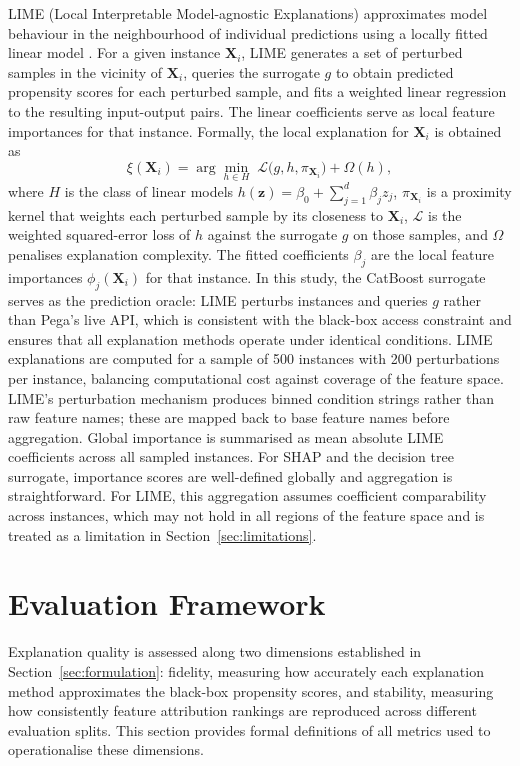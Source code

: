 \documentclass[oneside]{memoir} %
\begin{document}
LIME (Local Interpretable Model-agnostic Explanations) approximates model behaviour in the neighbourhood of individual predictions using a locally fitted linear model \parencite{ribeiro_why_2016}. For a given instance $\mathbf{X}_i$, LIME generates a set of perturbed samples in the vicinity of $\mathbf{X}_i$, queries the surrogate $g$ to obtain predicted propensity scores for each perturbed sample, and fits a weighted linear regression to the resulting input-output pairs. The linear coefficients serve as local feature importances for that instance. Formally, the local explanation for $\mathbf{X}_i$ is obtained as
\[
\xi(\mathbf{X}_i) = \arg\min_{h \in H}\; \mathcal{L}\big(g, h, \pi_{\mathbf{X}_i}\big) + \Omega(h),
\]
where $H$ is the class of linear models $h(\mathbf{z}) = \beta_0 + \sum_{j=1}^{d} \beta_j z_j$, $\pi_{\mathbf{X}_i}$ is a proximity kernel that weights each perturbed sample by its closeness to $\mathbf{X}_i$, $\mathcal{L}$ is the weighted squared-error loss of $h$ against the surrogate $g$ on those samples, and $\Omega$ penalises explanation complexity. The fitted coefficients $\beta_j$ are the local feature importances $\phi_j(\mathbf{X}_i)$ for that instance. In this study, the CatBoost surrogate serves as the prediction oracle: LIME perturbs instances and queries $g$ rather than Pega's live API, which is consistent with the black-box access constraint and ensures that all explanation methods operate under identical conditions. LIME explanations are computed for a sample of 500 instances with 200 perturbations per instance, balancing computational cost against coverage of the feature space. LIME's perturbation mechanism produces binned condition strings rather than raw feature names; these are mapped back to base feature names before aggregation. Global importance is summarised as mean absolute LIME coefficients across all sampled instances. For SHAP and the decision tree surrogate, importance scores are well-defined globally and aggregation is straightforward. For LIME, this aggregation assumes coefficient comparability across instances, which may not hold in all regions of the feature space and is treated as a limitation in Section~\ref{sec:limitations}.
\section{Evaluation Framework} \label{sec:evaluation}

Explanation quality is assessed along two dimensions established in Section~\ref{sec:formulation}: fidelity, measuring how accurately each explanation method approximates the black-box propensity scores, and stability, measuring how consistently feature attribution rankings are reproduced across different evaluation splits. This section provides formal definitions of all metrics used to operationalise these dimensions.
\end{document}
